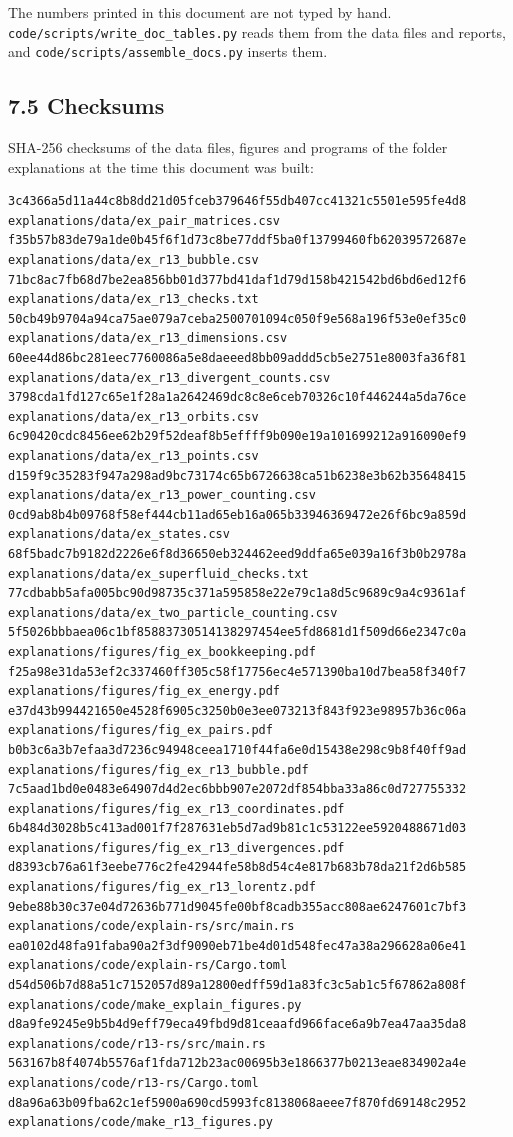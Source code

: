 \documentclass[
  10pt,
]{article}
\begin{document}
The numbers printed in this document are not typed by hand.
\texttt{code/scripts/write\_doc\_tables.py} reads them from the data
files and reports, and \texttt{code/scripts/assemble\_docs.py} inserts
them.

\hypertarget{checksums}{%
\subsection{7.5 Checksums}\label{checksums}}

SHA-256 checksums of the data files, figures and programs of the folder
explanations at the time this document was built:

\begin{verbatim}
3c4366a5d11a44c8b8dd21d05fceb379646f55db407cc41321c5501e595fe4d8  explanations/data/ex_pair_matrices.csv
f35b57b83de79a1de0b45f6f1d73c8be77ddf5ba0f13799460fb62039572687e  explanations/data/ex_r13_bubble.csv
71bc8ac7fb68d7be2ea856bb01d377bd41daf1d79d158b421542bd6bd6ed12f6  explanations/data/ex_r13_checks.txt
50cb49b9704a94ca75ae079a7ceba2500701094c050f9e568a196f53e0ef35c0  explanations/data/ex_r13_dimensions.csv
60ee44d86bc281eec7760086a5e8daeeed8bb09addd5cb5e2751e8003fa36f81  explanations/data/ex_r13_divergent_counts.csv
3798cda1fd127c65e1f28a1a2642469dc8c8e6ceb70326c10f446244a5da76ce  explanations/data/ex_r13_orbits.csv
6c90420cdc8456ee62b29f52deaf8b5effff9b090e19a101699212a916090ef9  explanations/data/ex_r13_points.csv
d159f9c35283f947a298ad9bc73174c65b6726638ca51b6238e3b62b35648415  explanations/data/ex_r13_power_counting.csv
0cd9ab8b4b09768f58ef444cb11ad65eb16a065b33946369472e26f6bc9a859d  explanations/data/ex_states.csv
68f5badc7b9182d2226e6f8d36650eb324462eed9ddfa65e039a16f3b0b2978a  explanations/data/ex_superfluid_checks.txt
77cdbabb5afa005bc90d98735c371a595858e22e79c1a8d5c9689c9a4c9361af  explanations/data/ex_two_particle_counting.csv
5f5026bbbaea06c1bf85883730514138297454ee5fd8681d1f509d66e2347c0a  explanations/figures/fig_ex_bookkeeping.pdf
f25a98e31da53ef2c337460ff305c58f17756ec4e571390ba10d7bea58f340f7  explanations/figures/fig_ex_energy.pdf
e37d43b994421650e4528f6905c3250b0e3ee073213f843f923e98957b36c06a  explanations/figures/fig_ex_pairs.pdf
b0b3c6a3b7efaa3d7236c94948ceea1710f44fa6e0d15438e298c9b8f40ff9ad  explanations/figures/fig_ex_r13_bubble.pdf
7c5aad1bd0e0483e64907d4d2ec6bbb907e2072df854bba33a86c0d727755332  explanations/figures/fig_ex_r13_coordinates.pdf
6b484d3028b5c413ad001f7f287631eb5d7ad9b81c1c53122ee5920488671d03  explanations/figures/fig_ex_r13_divergences.pdf
d8393cb76a61f3eebe776c2fe42944fe58b8d54c4e817b683b78da21f2d6b585  explanations/figures/fig_ex_r13_lorentz.pdf
9ebe88b30c37e04d72636b771d9045fe00bf8cadb355acc808ae6247601c7bf3  explanations/code/explain-rs/src/main.rs
ea0102d48fa91faba90a2f3df9090eb71be4d01d548fec47a38a296628a06e41  explanations/code/explain-rs/Cargo.toml
d54d506b7d88a51c7152057d89a12800edff59d1a83fc3c5ab1c5f67862a808f  explanations/code/make_explain_figures.py
d8a9fe9245e9b5b4d9eff79eca49fbd9d81ceaafd966face6a9b7ea47aa35da8  explanations/code/r13-rs/src/main.rs
563167b8f4074b5576af1fda712b23ac00695b3e1866377b0213eae834902a4e  explanations/code/r13-rs/Cargo.toml
d8a96a63b09fba62c1ef5900a690cd5993fc8138068aeee7f870fd69148c2952  explanations/code/make_r13_figures.py
\end{verbatim}
\end{document}
